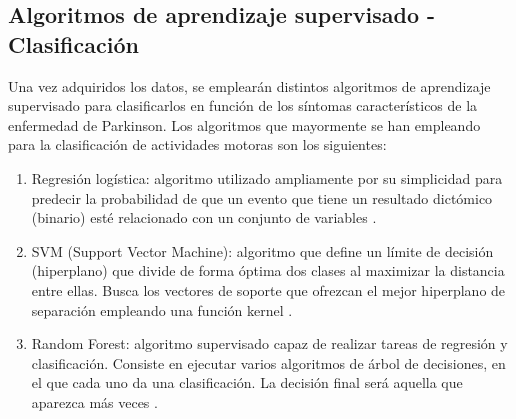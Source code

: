 \subsection{Algoritmos de aprendizaje supervisado - Clasificación}

Una vez adquiridos los datos, se emplearán distintos algoritmos de aprendizaje supervisado para clasificarlos en función de los síntomas característicos de la enfermedad de Parkinson.
Los algoritmos que mayormente se han empleando para la clasificación de actividades motoras son los siguientes:

\begin{enumerate}
    \item Regresión logística: algoritmo utilizado ampliamente por su simplicidad para predecir la probabilidad de que un evento que tiene un resultado dictómico (binario) esté relacionado con un conjunto de variables \cite{muniz2010comparison}. 
    \item SVM (Support Vector Machine): algoritmo que define un límite de decisión (hiperplano) que divide de forma óptima dos clases al maximizar la distancia entre ellas.  Busca los vectores de soporte  que ofrezcan el mejor hiperplano de separación empleando una función kernel \cite{bourouhou2016comparison}.
    \item Random Forest: algoritmo supervisado capaz de realizar tareas de regresión y clasificación. Consiste en ejecutar varios algoritmos de árbol de decisiones, en el que cada uno da una clasificación. La decisión final será aquella que aparezca más veces \cite{liaw2002classification}.
\end{enumerate}


